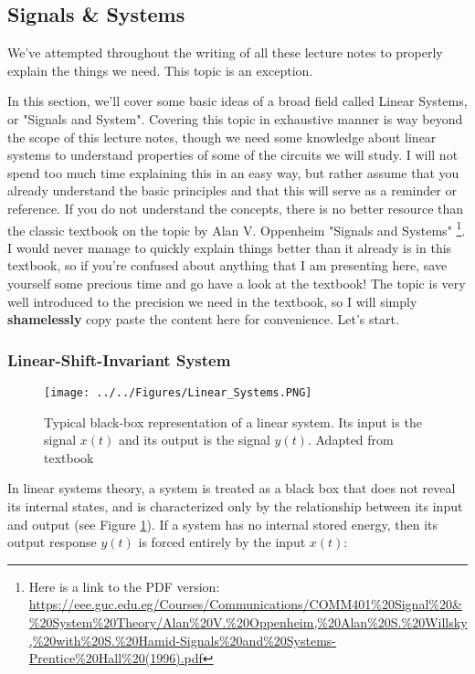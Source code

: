 \subsection{Signals & Systems}

We've attempted throughout the writing of all these lecture notes to properly explain the things we need. This topic is an exception. 

In this section, we'll cover some basic ideas of a broad field called Linear Systems, or "Signals and System". Covering this topic in exhaustive manner is way beyond the scope of this lecture notes, though we need some knowledge about linear systems to understand properties of some of the circuits we will study. I will not spend too much time explaining this in an easy way, but rather assume that you already understand the basic principles and that this will serve as a reminder or reference. If you do not understand the concepts, there is no better resource than the classic textbook on the topic by Alan V. Oppenheim  "Signals and Systems" \footnote{Here is a link to the PDF version: \url{https://eee.guc.edu.eg/Courses/Communications/COMM401\%20Signal\%20&\%20System\%20Theory/Alan\%20V.\%20Oppenheim,\%20Alan\%20S.\%20Willsky,\%20with\%20S.\%20Hamid-Signals\%20and\%20Systems-Prentice\%20Hall\%20(1996).pdf}}. I would never manage to quickly explain things better than it already is in this textbook, so if you're confused about anything that I am presenting here, save yourself some precious time and go have a look at the textbook! The topic is very well introduced to the precision we need in the textbook, so I will simply \textbf{shamelessly} copy paste the content here for convenience. Let's start.

\subsubsection{Linear-Shift-Invariant System}

\begin{figure}[H]
    \centering
    \texttt{[image: ../../Figures/Linear\_Systems.PNG]}
    \caption{Typical black-box representation of a linear system. Its input is the signal $x(t)$ and its output is the signal $y(t)$. Adapted from textbook}
    \label{fig:Linear_Systems_Black_Box}
\end{figure}

In linear systems theory, a system is treated as a black box that does not reveal its internal states, and is characterized only by the relationship between its input and output (see Figure \ref{fig:Linear_Systems_Black_Box}). If a system has no internal stored energy, then its output response $y(t)$ is forced entirely by the input $x(t)$:

